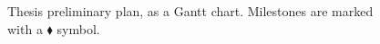 \documentclass[a4paper,fontsize=10pt,bibliography=totoc]{scrartcl}
\begin{document}
\begin{figure}[h!]
\centering
\footnotesize
{\setlength{\fboxsep}{0pt}}
\caption{Thesis preliminary plan, as a Gantt chart. Milestones are marked with a $\blacklozenge$ symbol.}
\label{f:gantt-chart}
\end{figure}
\end{document}
